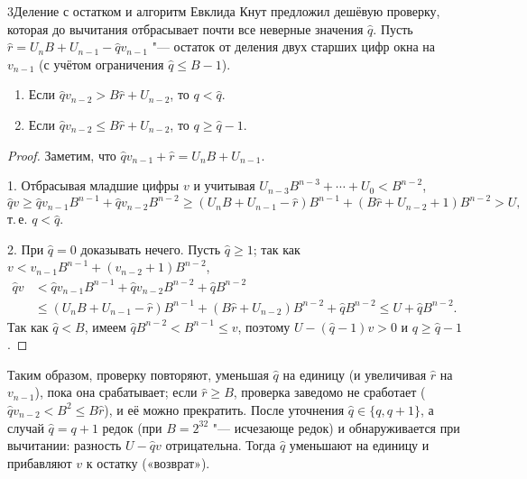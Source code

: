 \begin{lecture}{3}{Деление с остатком и алгоритм Евклида}
Кнут предложил дешёвую проверку, которая до вычитания отбрасывает почти все неверные
значения $\hat q$. Пусть $\hat r = U_n B + U_{n-1} - \hat q v_{n-1}$ "--- остаток от деления двух
старших цифр окна на $v_{n-1}$ (с учётом ограничения $\hat q \le B - 1$).

\begin{lemma}\label{l3:refine}
\begin{enumerate}
  \item Если $\hat q v_{n-2} > B \hat r + U_{n-2}$, то $q < \hat q$.
  \item Если $\hat q v_{n-2} \le B \hat r + U_{n-2}$, то $q \ge \hat q - 1$.
\end{enumerate}
\end{lemma}

\begin{proof}
Заметим, что $\hat q v_{n-1} + \hat r = U_n B + U_{n-1}$.

1. Отбрасывая младшие цифры $v$ и учитывая $U_{n-3} B^{n-3} + \cdots + U_0 < B^{n-2}$,
\[
  \hat q v \ge \hat q v_{n-1} B^{n-1} + \hat q v_{n-2} B^{n-2}
  \ge (U_n B + U_{n-1} - \hat r) B^{n-1} + (B \hat r + U_{n-2} + 1) B^{n-2}
  > U,
\]
т.\,е. $q < \hat q$.

2. При $\hat q = 0$ доказывать нечего. Пусть $\hat q \ge 1$; так как
$v < v_{n-1} B^{n-1} + (v_{n-2} + 1) B^{n-2}$,
\[
\begin{aligned}
  \hat q v &< \hat q v_{n-1} B^{n-1} + \hat q v_{n-2} B^{n-2} + \hat q B^{n-2}\\
  &\le (U_n B + U_{n-1} - \hat r) B^{n-1} + (B \hat r + U_{n-2}) B^{n-2} + \hat q B^{n-2}
  \le U + \hat q B^{n-2}.
\end{aligned}
\]
Так как $\hat q < B$, имеем $\hat q B^{n-2} < B^{n-1} \le v$, поэтому $U - (\hat q - 1) v > 0$
и $q \ge \hat q - 1$.
\end{proof}

Таким образом, проверку повторяют, уменьшая $\hat q$ на единицу (и увеличивая $\hat r$ на
$v_{n-1}$), пока она срабатывает; если $\hat r \ge B$, проверка заведомо не сработает
($\hat q v_{n-2} < B^2 \le B \hat r$), и её можно прекратить. После уточнения $\hat q \in \{q, q+1\}$,
а случай $\hat q = q + 1$ редок (при $B = 2^{32}$ "--- исчезающе редок) и обнаруживается при вычитании:
разность $U - \hat q v$ отрицательна. Тогда $\hat q$ уменьшают на единицу и прибавляют $v$ к
остатку («возврат»).


\end{lecture}
